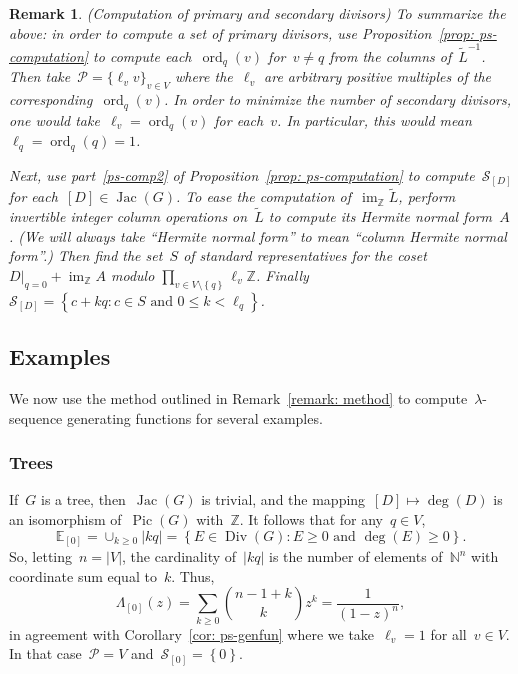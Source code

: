 \documentclass{amsart}
\newtheorem{Remark}[thm]{Remark}
\newenvironment{remark}
  {\begin{Remark}\rm}{\end{Remark}}
\DeclareMathOperator{\Pic}{Pic}
\DeclareMathOperator{\Jac}{Jac}
\DeclareMathOperator{\Div}{Div}
\DeclareMathOperator{\im}{im}
\DeclareMathOperator{\ord}{ord}
\newcommand{\primary}{\mathcal{P}}
\newcommand{\secondary}{\mathcal{S}}
\newcommand{\Z}{\mathbb{Z}}
\newcommand{\N}{\mathbb{N}}
\newcommand{\E}{\mathbb{E}}
\newcommand{\tL}{\tilde{L}}
\newcommand{\tl}{\ell}
\begin{document}
\begin{remark}\label{remark: method} (Computation of primary and secondary
  divisors) To summarize the above: in order to compute a set of primary
  divisors, use Proposition~\ref{prop: ps-computation} to compute
  each~$\ord_{q}(v)$ for~$v\neq q$ from the columns of~$\tL^{-1}$. Then
  take~$\primary=\{ \tl_v v \}_{v\in V}$ where the~$\tl_v$ are arbitrary
  positive multiples of the corresponding~$\ord_{q}(v)$.  In order to minimize
  the number of secondary divisors, one would take~$\tl_v=\ord_{q}(v)$ for
  each~$v$.  In particular, this would mean~$\tl_q=\ord_{q}(q)=1$.

  Next, use part~\ref{ps-comp2} of Proposition~\ref{prop: ps-computation} to
  compute~$\secondary_{[D]}$ for each~$[D]\in\Jac(G)$. To ease the computation
  of~$\im_{\Z}\tL$, perform invertible integer column operations on~$\tL$ to
  compute its Hermite normal form~$A$. (We will always take ``Hermite normal
  form'' to mean ``column Hermite normal form''.) Then find the set~$S$ of standard
  representatives for the coset $D|_{q=0}+\im_{\Z}A$ modulo $\prod_{v\in
  V\setminus\left\{ q \right\}}\tl_v\Z$.  Finally~$\secondary_{[D]}=\left\{
  c+kq:c\in S \text{ and } 0\leq k <\tl_q\right\}$.
  \end{remark}

  \subsection{Examples}  We now use the method outlined in Remark~\ref{remark:
  method} to compute~$\lambda$-sequence generating functions for several
  examples.
\subsubsection{Trees}\label{example: ps-tree} If~$G$ is a tree, then~$\Jac(G)$
is trivial, and the mapping~$[D]\mapsto\deg(D)$ is an isomorphism of~$\Pic(G)$
with~$\Z$.  It follows that for any~$q\in V$,
\[
  \E_{[0]} = \cup_{k\geq 0}|kq| = \left\{ E\in\Div(G):E\geq0 \text{ and }
  \deg(E)\geq0 \right\}.
\]
So, letting~$n=|V|$, the cardinality of~$|kq|$ is the number of elements of~$\N^n$
with coordinate sum equal to~$k$. Thus,
\[
  \Lambda_{[0]}(z)=\sum_{k\geq 0}\binom{n-1+k}{k}z^k=\frac{1}{(1-z)^n},
\]
in agreement with Corollary~\ref{cor: ps-genfun}
where we take~$\tl_v=1$ for all~$v\in V$.  In that case~$\primary=V$
and~$\secondary_{[0]}=\left\{ 0 \right\}$.  
\end{document}
